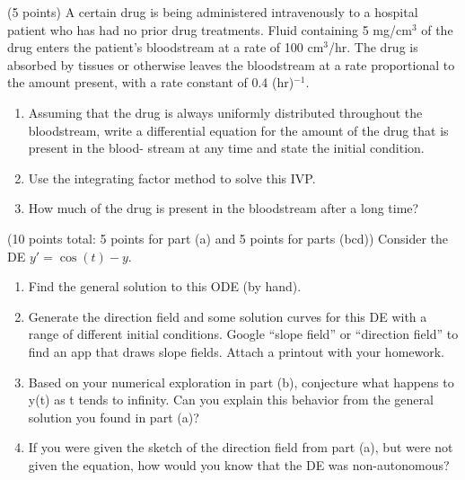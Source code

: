 \documentclass[11pt,letterpaper,boxed]{hmcpset}
\begin{document}


\begin{problem}[1]
(5 points) A certain drug is being administered intravenously to a hospital patient who has had no prior drug treatments. Fluid containing 5 mg/cm$^3$ of the drug enters the patient’s bloodstream at a rate of 100 cm$^3$/hr. The drug is absorbed by tissues or otherwise leaves the bloodstream at a rate proportional to the amount present, with a rate constant of 0.4 (hr)$^{-1}$.
\begin{enumerate}
\item Assuming that the drug is always uniformly distributed throughout the bloodstream, write a differential equation for the amount of the drug that is present in the blood- stream at any time and state the initial condition.
\item Use the integrating factor method to solve this IVP.
\item How much of the drug is present in the bloodstream after a long time?
\end{enumerate}
\end{problem}


\pagebreak


\begin{problem}[2]
(10 points total: 5 points for part (a) and 5 points for parts (bcd)) Consider the DE $y' = \cos(t)-y$.
\begin{enumerate}
\item Find the general solution to this ODE (by hand).
\item Generate the direction field and some solution curves for this DE with a range of different initial conditions. Google “slope field” or “direction field” to find an app that draws slope fields. Attach a printout with your homework.
\item Based on your numerical exploration in part (b), conjecture what happens to y(t) as t tends to infinity. Can you explain this behavior from the general solution you found in part (a)?
\item If you were given the sketch of the direction field from part (a), but were not given the equation, how would you know that the DE was non-autonomous?
\end{enumerate}
\end{problem}
\end{document}
